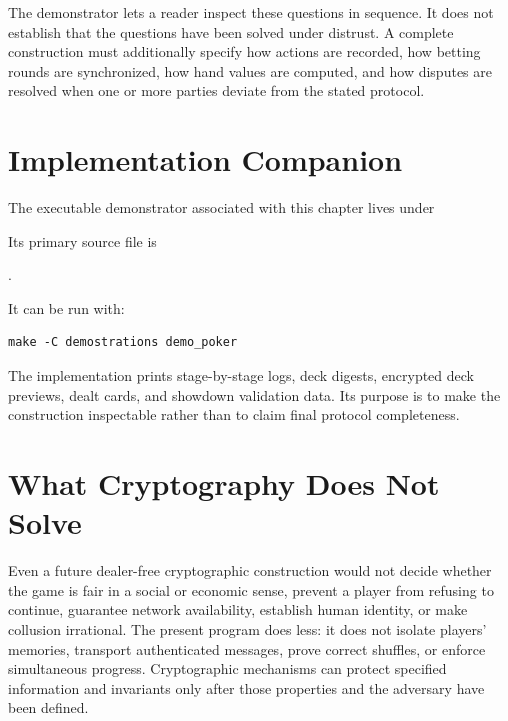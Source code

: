 The demonstrator lets a reader inspect these questions in sequence.  It does
not establish that the questions have been solved under distrust.  A complete
construction must additionally specify how actions are recorded, how betting
rounds are synchronized, how hand values are computed, and how disputes are
resolved when one or more parties deviate from the stated protocol.

\section{Implementation Companion}
The executable demonstrator associated with this chapter lives under
\begin{center}
\end{center}
Its primary source file is
\begin{center}
.
\end{center}
It can be run with:
\begin{verbatim}
make -C demostrations demo_poker
\end{verbatim}

The implementation prints stage-by-stage logs, deck digests, encrypted deck
previews, dealt cards, and showdown validation data. Its purpose is to make the
construction inspectable rather than to claim final protocol completeness.

\section{What Cryptography Does Not Solve}
Even a future dealer-free cryptographic construction would not decide whether
the game is fair in a social or economic sense, prevent a player from refusing
to continue, guarantee network availability, establish human identity, or make
collusion irrational.  The present program does less: it does not isolate
players' memories, transport authenticated messages, prove correct shuffles,
or enforce simultaneous progress.  Cryptographic mechanisms can protect
specified information and invariants only after those properties and the
adversary have been defined.

